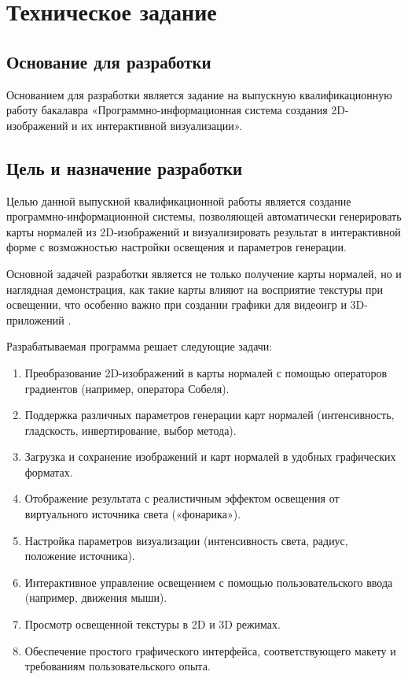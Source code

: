 \section{Техническое задание}
\subsection{Основание для разработки}

Основанием для разработки является задание на выпускную квалификационную работу бакалавра «Программно-информационная система создания 2D-изображений и их интерактивной визуализации».

\subsection{Цель и назначение разработки}

Целью данной выпускной квалификационной работы является создание программно-информационной системы, позволяющей автоматически генерировать карты нормалей из 2D-изображений и визуализировать результат в интерактивной форме с возможностью настройки освещения и параметров генерации.

Основной задачей разработки является не только получение карты нормалей, но и наглядная демонстрация, как такие карты влияют на восприятие текстуры при освещении, что особенно важно при создании графики для видеоигр и 3D-приложений \cite{matiz2020}.

Разрабатываемая программа решает следующие задачи:
\begin{enumerate}
	\item Преобразование 2D-изображений в карты нормалей с помощью операторов градиентов (например, оператора Собеля).
	\item Поддержка различных параметров генерации карт нормалей (интенсивность, гладскость, инвертирование, выбор метода).
	\item Загрузка и сохранение изображений и карт нормалей в удобных графических форматах.
	\item Отображение результата с реалистичным эффектом освещения от виртуального источника света («фонарика»).
	\item Настройка параметров визуализации (интенсивность света, радиус, положение источника).
	\item Интерактивное управление освещением с помощью пользовательского ввода (например, движения мыши).
	\item Просмотр освещенной текстуры в 2D и 3D режимах.
	\item Обеспечение простого графического интерфейса, соответствующего макету и требованиям пользовательского опыта.
\end{enumerate}
